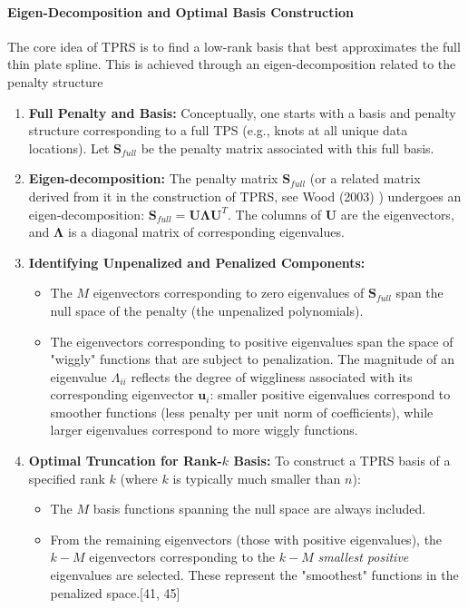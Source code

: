 \documentclass[11pt, a4paper]{article}
\begin{document}
\begin{itemize}
\paragraph{Eigen-Decomposition and Optimal Basis Construction}
The core idea of TPRS is to find a low-rank basis that best approximates the full thin plate spline. This is achieved through an eigen-decomposition related to the penalty structure 
\begin{enumerate}
 \item \textbf{Full Penalty and Basis:} Conceptually, one starts with a basis and penalty structure corresponding to a full TPS (e.g., knots at all unique data locations). Let $\mathbf{S}_{full}$ be the penalty matrix associated with this full basis.
 \item \textbf{Eigen-decomposition:} The penalty matrix $\mathbf{S}_{full}$ (or a related matrix derived from it in the construction of TPRS, see Wood (2003) ) undergoes an eigen-decomposition: $\mathbf{S}_{full} = \mathbf{U \Lambda U}^T$. The columns of $\mathbf{U}$ are the eigenvectors, and $\mathbf{\Lambda}$ is a diagonal matrix of corresponding eigenvalues.
 \item \textbf{Identifying Unpenalized and Penalized Components:}
 \begin{itemize}
\item The $M$ eigenvectors corresponding to zero eigenvalues of $\mathbf{S}_{full}$ span the null space of the penalty (the unpenalized polynomials).
\item The eigenvectors corresponding to positive eigenvalues span the space of "wiggly" functions that are subject to penalization. The magnitude of an eigenvalue $\Lambda_{ii}$ reflects the degree of wiggliness associated with its corresponding eigenvector $\mathbf{u}_i$: smaller positive eigenvalues correspond to smoother functions (less penalty per unit norm of coefficients), while larger eigenvalues correspond to more wiggly functions.
 \end{itemize}
 \item \textbf{Optimal Truncation for Rank-$k$ Basis:} To construct a TPRS basis of a specified rank $k$ (where $k$ is typically much smaller than $n$):
\begin{itemize}
\item The $M$ basis functions spanning the null space are always included.
\item From the remaining eigenvectors (those with positive eigenvalues), the $k-M$ eigenvectors corresponding to the $k-M$ \textit{smallest positive} eigenvalues are selected. These represent the "smoothest" functions in the penalized space.[41, 45]

\end{itemize}
\end{enumerate}
\end{itemize}
\end{document}
